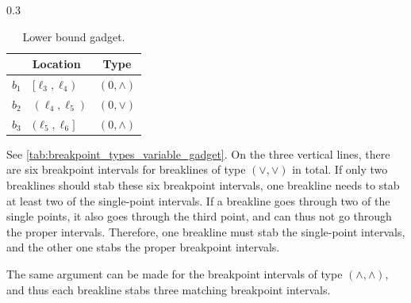 \begin{table}[htb]
    \hfill
    \begin{subtable}[b]{0.3\textwidth}
        \centering
        \begin{tabular}{llc}
            \toprule
            & Location & Type \\
            \midrule
            $b_1$ & $[\ell_3,\ell_4)$ & $(0,\wedge)$ \\
            $b_2$ & $(\ell_4,\ell_5)$ & $(0,\vee)$ \\
            $b_3$ & $(\ell_5,\ell_6]$ & $(0,\wedge)$ \\
            \bottomrule
        \end{tabular}
        \vspace{9.9mm}
        \caption{Lower bound gadget.}
        \label{tab:breakpoint_types_lower_bound_gadget}
    \end{subtable}
    \label{tab:breakpoint_types}
\end{table}


\begin{claimproof}
    See \cref{tab:breakpoint_types_variable_gadget}.
    On the three vertical lines, there are six breakpoint intervals for breaklines of type $(\vee,\vee)$ in total.
    If only two breaklines should stab these six breakpoint intervals, one breakline needs to stab at least two of the single-point intervals.
    If a breakline goes through two of the single points, it also goes through the third point, and can thus not go through the proper intervals.
    Therefore, one breakline must stab the single-point intervals, and the other one stabs the proper breakpoint intervals.

    The same argument can be made for the breakpoint intervals of type $(\wedge,\wedge)$, and thus each breakline stabs three matching breakpoint intervals.
\end{claimproof}



